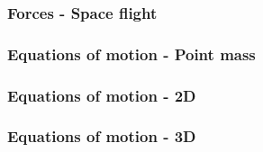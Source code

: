\subsubsection{Forces - Space flight}
\subsubsection{Equations of motion - Point mass}
\subsubsection{Equations of motion - 2D}
\subsubsection{Equations of motion - 3D}
